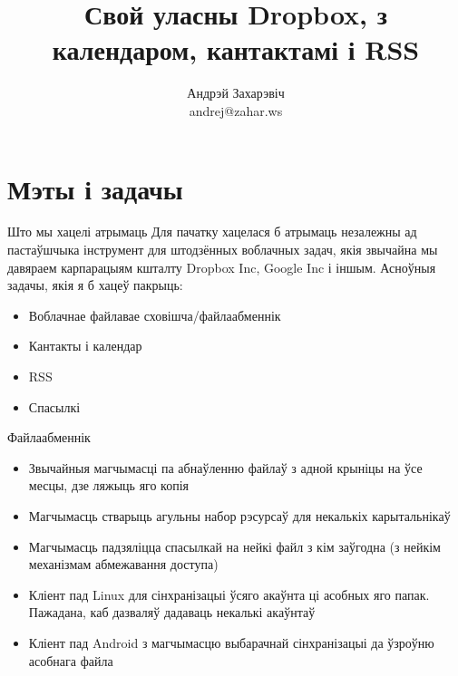 \documentclass[ignorenonframetext,hyperref={pdftex,unicode}]{beamer}
\title{Свой уласны Dropbox, з календаром, кантактамі і RSS}
\author[Андрэй Захарэвіч]{Андрэй Захарэвіч\\ andrej@zahar.ws}
\begin{document}
\frame{\titlepage} 


\section{Мэты і задачы} 

\begin{frame}{Што мы хацелі атрымаць} 
	Для пачатку хацелася б атрымаць незалежны ад пастаўшчыка інструмент для штодзённых воблачных задач, якія звычайна мы давяраем карпарацыям кшталту Dropbox Inc, Google Inc і іншым. Асноўныя задачы, якія я б хацеў пакрыць:\pause
	\begin{itemize}
		\item Воблачнае файлавае сховішча/файлаабменнік
		\item Кантакты і календар
		\item RSS
		\item Спасылкі
	\end{itemize}
	\begin{center}
	\end{center}
\end{frame}

\begin{frame}{Файлаабменнік}
	\begin{itemize}
		\item Звычайныя магчымасці па абнаўленню файлаў з адной крыніцы на ўсе месцы, дзе ляжыць яго копія \pause
		\item Магчымасць стварыць агульны набор рэсурсаў для некалькіх карытальнікаў \pause
		\item Магчымасць падзяліцца спасылкай на нейкі файл з кім заўгодна (з нейкім механізмам абмежавання доступа) \pause
		\item Кліент пад Linux для сінхранізацыі ўсяго акаўнта ці асобных яго папак. Пажадана, каб дазваляў дадаваць некалькі акаўнтаў \pause
		\item Кліент пад Android з магчымасцю выбарачнай сінхранізацыі да ўзроўню асобнага файла
	\end{itemize}
\end{frame}
\end{document}
